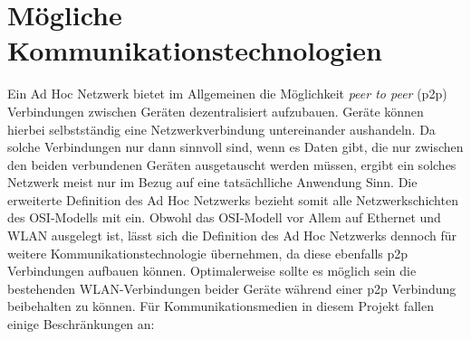 \section{Mögliche Kommunikationstechnologien}
    Ein Ad Hoc Netzwerk bietet im Allgemeinen die Möglichkeit {\it peer to peer} (p2p) Verbindungen zwischen Geräten dezentralisiert aufzubauen.
    Geräte können hierbei selbstständig eine Netzwerkverbindung untereinander aushandeln. Da solche Verbindungen nur dann sinnvoll sind,
    wenn es Daten gibt, die nur zwischen den beiden verbundenen Geräten ausgetauscht werden müssen, ergibt ein solches Netzwerk meist nur
    im Bezug auf eine tatsächlliche Anwendung Sinn. Die erweiterte Definition des Ad Hoc Netzwerks
    bezieht somit alle Netzwerkschichten des OSI-Modells mit ein.\cite[S.23]{Sikora}
    Obwohl das OSI-Modell vor Allem auf Ethernet und WLAN ausgelegt ist, lässt sich die Definition des Ad Hoc Netzwerks
    dennoch für weitere Kommunikationstechnologie übernehmen, da diese ebenfalls p2p Verbindungen aufbauen können.
    Optimalerweise sollte es möglich sein die bestehenden WLAN-Verbindungen beider Geräte während einer p2p Verbindung beibehalten zu können.
    Für Kommunikationsmedien in diesem Projekt fallen einige Beschränkungen an: 
